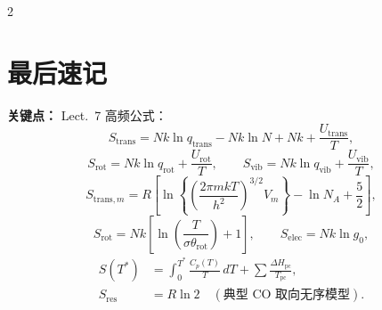 \documentclass[a4paper,9pt]{article}
\newenvironment{keypoint}
{\par\vspace{0.3em}\noindent\begin{tcolorbox}[colback=keybg,colframe=keycolor,boxrule=0.5pt,arc=2pt,left=2pt,right=2pt,top=2pt,bottom=2pt,boxsep=0pt]\noindent\textcolor{keycolor}{\textbf{关键点：}}}
{\end{tcolorbox}\par\vspace{0.3em}}
\begin{document}
\begin{multicols}{2}
	\section{最后速记}
	\begin{keypoint}
		Lect.~7 高频公式：
		\[
			S_{\mathrm{trans}}=Nk\ln q_{\mathrm{trans}}-Nk\ln N+Nk+\frac{U_{\mathrm{trans}}}{T},
		\]
		\[
			S_{\mathrm{rot}}=Nk\ln q_{\mathrm{rot}}+\frac{U_{\mathrm{rot}}}{T},
			\qquad
			S_{\mathrm{vib}}=Nk\ln q_{\mathrm{vib}}+\frac{U_{\mathrm{vib}}}{T},
		\]
		\[
			S_{\mathrm{trans},m}=R\left[\ln\left\{\left(\frac{2\pi mkT}{h^2}\right)^{3/2}V_m\right\}-\ln N_A+\frac52\right],
		\]
		\[
			S_{\mathrm{rot}}=Nk\left[\ln\left(\frac{T}{\sigma\theta_{\mathrm{rot}}}\right)+1\right],
			\qquad
			S_{\mathrm{elec}}=Nk\ln g_0,
		\]
		\[
			\begin{aligned}
				S(T^*)           & =\int_0^{T^*}\frac{C_p(T)}{T}\,dT+\sum\frac{\Delta H_{\mathrm{pc}}}{T_{\mathrm{pc}}}, \\
				S_{\mathrm{res}} & =R\ln 2\quad (\text{典型 CO 取向无序模型}).
			\end{aligned}
		\]
	\end{keypoint}

\end{multicols}
\end{document}
